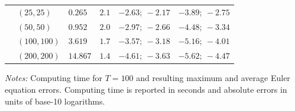 \documentclass[a4paper,12pt]{article}
\begin{document}
\begin{table}[htbp]
\begin{threeparttable}
\begin{tabular}{L{0.1cm}C{2.5cm}C{2cm}C{2cm}C{3cm}C{3cm}}
		& $\left(  25,25  \right)$ &  $0.265$ & $2.1$ & $-2.63;\ -2.17$ & $-3.89;\ -2.75$ \\
		& $\left(  50,50  \right)$ &  $0.952$ & $2.0$ & $-2.97;\ -2.66$ & $-4.48;\ -3.34$ \\
		& $\left( 100,100 \right)$ &  $3.619$ & $1.7$ & $-3.57;\ -3.18$ & $-5.16;\ -4.01$ \\
		& $\left( 200,200 \right)$ & $14.867$ & $1.4$ & $-4.61;\ -3.63$ & $-5.62;\ -4.47$ \\
		\bottomrule
	\end{tabular}
	\begin{tablenotes}
		\footnotesize
		\emph{Notes:} Computing time for $T=100$ and resulting maximum and average Euler equation errors. Computing time is reported in seconds and absolute errors in units of base-10 logarithms.
	\end{tablenotes}
\end{threeparttable}
\end{table}
\end{document}

